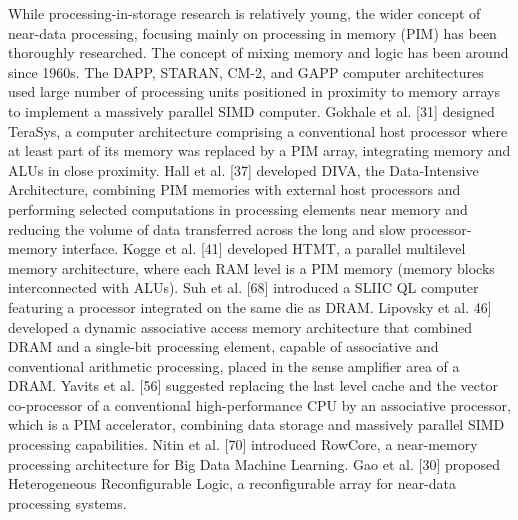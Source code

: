 \documentclass{superfri}
\begin{document}
While processing-in-storage research is relatively young, the wider concept of near-data processing, focusing mainly on processing in memory (PIM) has been thoroughly researched. The concept of mixing memory and logic has been around since 1960s. The DAPP, STARAN, CM-2, and GAPP computer architectures \cite{potter1989array} used large number of processing units positioned in proximity to memory arrays to implement a massively parallel SIMD computer. Gokhale et al. [31] designed TeraSys, a computer architecture comprising a conventional host processor where at least part of its memory was replaced by a PIM array, integrating memory and ALUs in close proximity. Hall et al. [37] developed DIVA, the Data-Intensive Architecture, combining PIM memories with external host processors and performing selected computations in processing elements near memory and reducing the volume of data transferred across the long and slow processor-memory interface. Kogge et al. [41] developed HTMT, a parallel multilevel memory architecture, where each RAM level is a PIM memory (memory blocks interconnected with ALUs). Suh et al. [68]  introduced a SLIIC QL computer featuring a processor integrated on the same die as DRAM. Lipovsky et al. 46] developed a dynamic associative access memory architecture that combined DRAM and a single-bit processing element, capable of associative and conventional arithmetic processing, placed in the sense amplifier area of a DRAM. Yavits et al. [56] suggested replacing the last level cache and the vector co-processor of a conventional high-performance CPU by an associative processor, which is a PIM accelerator, combining data storage and massively parallel SIMD processing capabilities. Nitin et al. [70] introduced RowCore, a near-memory processing architecture for Big Data Machine Learning. Gao et al. [30] proposed Heterogeneous Reconfigurable Logic, a reconfigurable array for near-data processing systems.

\end{document}
